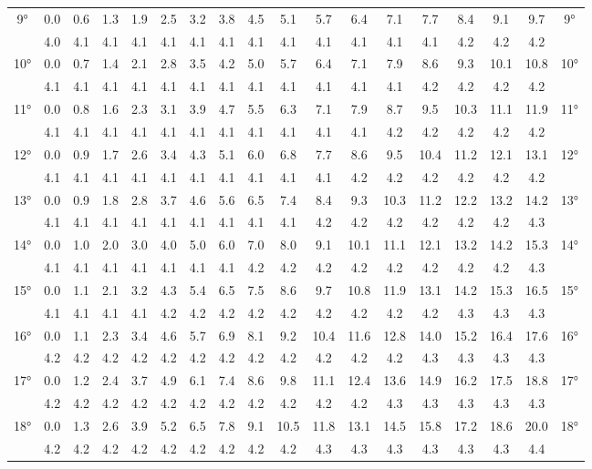 \begin{footnotesize}
\begin{tabular}{c || c | c | c | c | c | c | c | c | c | c | c | c | c | c | c | c || c}
		\multirow{2}{*}{9°}&0.0&0.6&1.3&1.9&2.5&3.2&3.8&4.5&5.1&5.7&6.4&7.1&7.7&8.4&9.1&9.7&\multirow{2}{*}{9°}\\ \space&4.0&4.1&4.1&4.1&4.1&4.1&4.1&4.1&4.1&4.1&4.1&4.1&4.1&4.2&4.2&4.2&\space\\\hline
		\multirow{2}{*}{10°}&0.0&0.7&1.4&2.1&2.8&3.5&4.2&5.0&5.7&6.4&7.1&7.9&8.6&9.3&10.1&10.8&\multirow{2}{*}{10°}\\ \space&4.1&4.1&4.1&4.1&4.1&4.1&4.1&4.1&4.1&4.1&4.1&4.1&4.2&4.2&4.2&4.2&\space\\\hline
		\multirow{2}{*}{11°}&0.0&0.8&1.6&2.3&3.1&3.9&4.7&5.5&6.3&7.1&7.9&8.7&9.5&10.3&11.1&11.9&\multirow{2}{*}{11°}\\ \space&4.1&4.1&4.1&4.1&4.1&4.1&4.1&4.1&4.1&4.1&4.1&4.2&4.2&4.2&4.2&4.2&\space\\\hline
		\multirow{2}{*}{12°}&0.0&0.9&1.7&2.6&3.4&4.3&5.1&6.0&6.8&7.7&8.6&9.5&10.4&11.2&12.1&13.1&\multirow{2}{*}{12°}\\ \space&4.1&4.1&4.1&4.1&4.1&4.1&4.1&4.1&4.1&4.1&4.2&4.2&4.2&4.2&4.2&4.2&\space\\\hline
		\multirow{2}{*}{13°}&0.0&0.9&1.8&2.8&3.7&4.6&5.6&6.5&7.4&8.4&9.3&10.3&11.2&12.2&13.2&14.2&\multirow{2}{*}{13°}\\ \space&4.1&4.1&4.1&4.1&4.1&4.1&4.1&4.1&4.1&4.2&4.2&4.2&4.2&4.2&4.2&4.3&\space\\\hline
		\multirow{2}{*}{14°}&0.0&1.0&2.0&3.0&4.0&5.0&6.0&7.0&8.0&9.1&10.1&11.1&12.1&13.2&14.2&15.3&\multirow{2}{*}{14°}\\ \space&4.1&4.1&4.1&4.1&4.1&4.1&4.1&4.2&4.2&4.2&4.2&4.2&4.2&4.2&4.2&4.3&\space\\\hline
		\multirow{2}{*}{15°}&0.0&1.1&2.1&3.2&4.3&5.4&6.5&7.5&8.6&9.7&10.8&11.9&13.1&14.2&15.3&16.5&\multirow{2}{*}{15°}\\ \space&4.1&4.1&4.1&4.1&4.2&4.2&4.2&4.2&4.2&4.2&4.2&4.2&4.2&4.3&4.3&4.3&\space\\\hline
		\multirow{2}{*}{16°}&0.0&1.1&2.3&3.4&4.6&5.7&6.9&8.1&9.2&10.4&11.6&12.8&14.0&15.2&16.4&17.6&\multirow{2}{*}{16°}\\ \space&4.2&4.2&4.2&4.2&4.2&4.2&4.2&4.2&4.2&4.2&4.2&4.2&4.3&4.3&4.3&4.3&\space\\\hline
		\multirow{2}{*}{17°}&0.0&1.2&2.4&3.7&4.9&6.1&7.4&8.6&9.8&11.1&12.4&13.6&14.9&16.2&17.5&18.8&\multirow{2}{*}{17°}\\ \space&4.2&4.2&4.2&4.2&4.2&4.2&4.2&4.2&4.2&4.2&4.2&4.3&4.3&4.3&4.3&4.3&\space\\\hline
		\multirow{2}{*}{18°}&0.0&1.3&2.6&3.9&5.2&6.5&7.8&9.1&10.5&11.8&13.1&14.5&15.8&17.2&18.6&20.0&\multirow{2}{*}{18°}\\ \space&4.2&4.2&4.2&4.2&4.2&4.2&4.2&4.2&4.2&4.3&4.3&4.3&4.3&4.3&4.3&4.4&\space\\\hline

\end{tabular}
\end{footnotesize}
